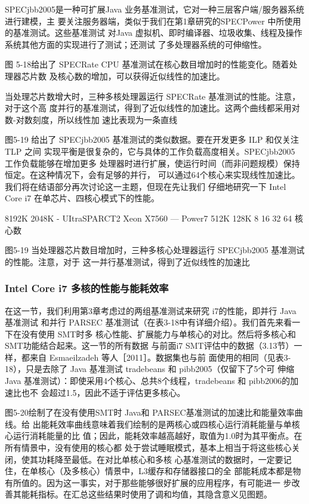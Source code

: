 SPECjbb2005是一种可扩展Java 业务基准测试，它对一种三层客户端/服务器系统进行建模，主
要关注服务器端，类似于我们在第1章研究的SPECPower 中所使用的基准测试。这些基准测试
对Java 虚拟机、即时编译器、垃圾收集、线程及操作系统其他方面的实现进行了测试；还测试
了多处理器系统的可伸缩性。

图 5-18给出了 SPECRate CPU 基准测试在核心数目增加时的性能变化。随着处理器芯片数
及核心数的增加，可以获得近似线性的加速比。

当处理芯片数增大时，三种多核处理嚣运行 SPECRate 基准测试的性能。注意，对于这个高
度并行的基准测试，得到了近似线性的加速比。这两个曲线都采用对数-对数刻度，所以线性加
速比表现为一条直线

图5-19 给出了 SPECjbb2005 基准测试的类似数据。要在开发更多 ILP 和仅关注 TLP 之间
实现平衡是很复杂的，它与具体的工作负载高度相关。SPECjbb2005 工作负载能够在增加更多
处理器时进行扩展，使运行时间（而非问题规模）保持恒定。在这种情况下，会有足够的并行，
可以通过64个核心来实现线性加速比。我们将在结语部分再次讨论这一主题，但现在先让我们
仔细地研究一下 Intel Core i7 在单芯片、四核心模式下的性能。

8192K
2048K
- UItraSPARCT2
Xeon X7560
— Power7
512K
128K
8
16
32
64
核心数

图5-19 当处理器芯片数目增加时，三种多核心处理器运行 SPECjbb2005 基准测试的性能。注意，对于
这一并行基准测试，得到了近似线性的加速比

\subsubsection{Intel Core i7 多核的性能与能耗效率}
在这一节，我们利用第3章考虑过的两组基准测试来研究 i7的性能，即并行 Java 基准测试
和并行 PARSEC 基准测试（在表3-18中有详细介绍）。我们首先来看一下在没有使用 SMT时多
核心性能、扩展能力与单核心的对比。然后将多核心和SMT功能结合起来。这一节的所有数据
与前面i7 SMT评估中的数据（3.13节）一样，都来自 Esmaeilzadeh 等人［2011］。数据集也与前
面使用的相同（见表3-18），只是去除了 Java 基准测试 tradebeans 和 pibb2005（仅留下了5个可
伸缩Java 基准测试）：即使采用4个核心、总共8个线程，tradebeans 和 pibb2006的加速比也不
会超过1.5，因此不适于评估更多核心。

图5-20绘制了在没有使用SMT时 Java和 PARSEC基准测试的加速比和能量效率曲线。给
出能耗效率曲线意味着我们绘制的是两核心或四核心运行消耗能量与单核心运行消耗能量的比
值；因此，能耗效率越高越好，取值为1.0时为其平衡点。在所有情景中，没有使用的核心都
处于尝试睡眠模式，基本上相当于将这些核心关闭，使其功耗降至最低。在对比单核心和多核
心基准测试的数据时，一定要记住，在单核心（及多核心）情景中，L3缓存和存储器接口的全
部能耗成本都是物有所值的。因为这一事实，对于那些能够很好扩展的应用程序，有可能进一
步改善其能耗指标。在汇总这些结果时使用了调和均值，其隐含意义见图题。

